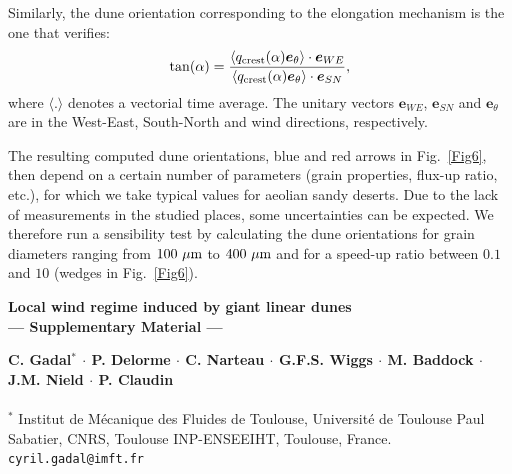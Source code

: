 Similarly, the dune orientation corresponding to the elongation mechanism is the one that verifies:
%
\begin{equation}
\tan(\alpha) = \frac{\langle q_{\textup{crest}}(\alpha) \boldsymbol{e}_{\theta}\rangle \cdot \boldsymbol{e}_{WE} }{ \langle q_{\textup{crest}}(\alpha) \boldsymbol{e}_{\theta} \rangle \cdot \boldsymbol{e}_{SN}},
\end{equation}
%
where $\langle.\rangle$ denotes a vectorial time average. The unitary vectors $\boldsymbol{e}_{WE}$, $\boldsymbol{e}_{SN}$ and $\boldsymbol{e}_{\theta}$ are in the West-East, South-North and wind directions, respectively.

The resulting computed dune orientations, blue and red arrows in Fig.~\ref{Fig6}, then depend on a certain number of parameters (grain properties, flux-up ratio, etc.), for which we take typical values for aeolian sandy deserts. Due to the lack of measurements in the studied places, some uncertainties can be expected. We therefore run a sensibility test by calculating the dune orientations for grain diameters ranging from $100~\mu\textup{m}$ to $400~\mu\textup{m}$ and for a speed-up ratio between $0.1$ and $10$ (wedges in Fig.~\ref{Fig6}).


\clearpage





\newpage

\renewcommand{\thefigure}{S\arabic{figure}}
\setcounter{figure}{0}

\begin{center}
\textbf{\large
Local wind regime induced by giant linear dunes \\
--- Supplementary Material ---
}
\end{center}

\noindent
\textbf{C. Gadal$^{*}$ $\cdot$ P. Delorme $\cdot$ C. Narteau $\cdot$ G.F.S. Wiggs $\cdot$ M. Baddock $\cdot$ J.M. Nield $\cdot$ P. Claudin}
\\ \\
$^{*}$ Institut de M\'ecanique des Fluides de Toulouse, Universit\'e de Toulouse Paul Sabatier, CNRS, Toulouse INP-ENSEEIHT, Toulouse, France.\\
\texttt{cyril.gadal@imft.fr}

